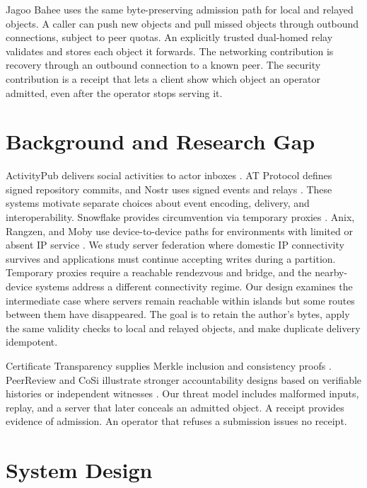 \documentclass[conference,a4paper,10pt]{IEEEtran}
\begin{document}
Jagoo Bahee uses the same byte-preserving admission path for local and relayed objects. A caller can push new objects and pull missed objects through outbound connections, subject to peer quotas. An explicitly trusted dual-homed relay validates and stores each object it forwards. The networking contribution is recovery through an outbound connection to a known peer. The security contribution is a receipt that lets a client show which object an operator admitted, even after the operator stops serving it.

\section{Background and Research Gap}

ActivityPub delivers social activities to actor inboxes \cite{activitypub}. AT Protocol defines signed repository commits, and Nostr uses signed events and relays \cite{atproto,nostr}. These systems motivate separate choices about event encoding, delivery, and interoperability. Snowflake provides circumvention via temporary proxies \cite{bocovich2024snowflake}. Anix, Rangzen, and Moby use device-to-device paths for environments with limited or absent IP service \cite{kamali2025anix,lerner2016rangzen,pradeep2022moby}. We study server federation where domestic IP connectivity survives and applications must continue accepting writes during a partition. Temporary proxies require a reachable rendezvous and bridge, and the nearby-device systems address a different connectivity regime. Our design examines the intermediate case where servers remain reachable within islands but some routes between them have disappeared. The goal is to retain the author's bytes, apply the same validity checks to local and relayed objects, and make duplicate delivery idempotent.

Certificate Transparency supplies Merkle inclusion and consistency proofs \cite{rfc6962,rfc9162}. PeerReview and CoSi illustrate stronger accountability designs based on verifiable histories or independent witnesses \cite{haeberlen2007peerreview,syta2016cosi}. Our threat model includes malformed inputs, replay, and a server that later conceals an admitted object. A receipt provides evidence of admission. An operator that refuses a submission issues no receipt.

\section{System Design}
\end{document}
